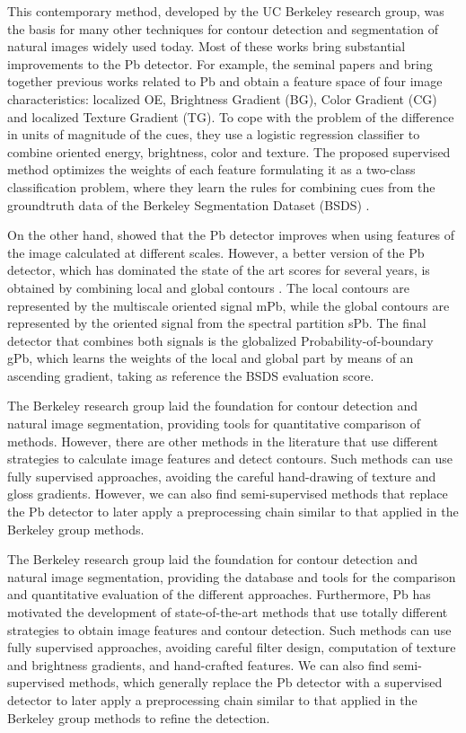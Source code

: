This contemporary method, developed by the UC Berkeley research group, was the basis for many other techniques for contour detection and segmentation of natural images widely used today. Most of these works bring substantial improvements to the Pb detector. For example, the seminal papers \citep{Martin.Fowlkes.ea:NIPS:2002} and \citep{Martin.Fowlkes.ea:PAMI:2004} bring together previous works related to Pb and obtain a feature space of four image characteristics: localized OE, Brightness Gradient (BG), Color Gradient (CG) and localized Texture Gradient (TG). To cope with the problem of the difference in units of magnitude of the cues, they use a logistic regression classifier to combine oriented energy, brightness, color and texture. The proposed supervised method optimizes the weights of each feature formulating it as a two-class classification problem, where they learn the rules for combining cues from the groundtruth data of the Berkeley Segmentation Dataset (BSDS) \citep{Martin.Fowlkes.ea:ICCV:2001}.

On the other hand, \cite{Ren:ECCV:2008} showed that the Pb detector improves when using features of the image calculated at different scales. However, a better version of the Pb detector, which has dominated the state of the art scores for several years, is obtained by combining local and global contours \citep{Maire.Arbelaez.ea:CVPR:2008}. The local contours are represented by the multiscale oriented signal mPb, while the global contours are represented by the oriented signal from the spectral partition sPb. The final detector that combines both signals is the globalized Probability-of-boundary gPb, which learns the weights of the local and global part by means of an ascending gradient, taking as reference the BSDS evaluation score.

The Berkeley research group laid the foundation for contour detection and natural image segmentation, providing tools for quantitative comparison of methods. However, there are other methods in the literature that use different strategies to calculate image features and detect contours. Such methods can use fully supervised approaches, avoiding the careful hand-drawing of texture and gloss gradients. However, we can also find semi-supervised methods that replace the Pb detector to later apply a preprocessing chain similar to that applied in the Berkeley group methods.

The Berkeley research group laid the foundation for contour detection and natural image segmentation, providing the database and tools for the comparison and quantitative evaluation of the different approaches. Furthermore, Pb has motivated the development of state-of-the-art methods that use totally different strategies to obtain image features and contour detection. Such methods can use fully supervised approaches, avoiding careful filter design, computation of texture and brightness gradients, and hand-crafted features. We can also find semi-supervised methods, which generally replace the Pb detector with a supervised detector to later apply a preprocessing chain similar to that applied in the Berkeley group methods to refine the detection.

